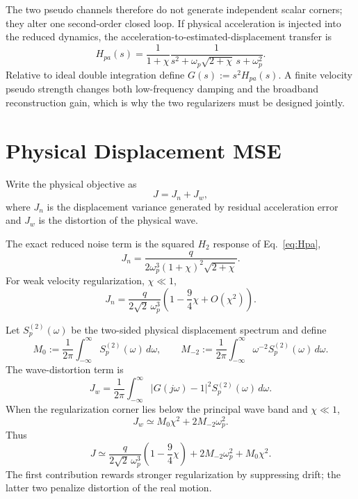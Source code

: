 \documentclass[conference]{IEEEtran}
\begin{document}
The two pseudo channels therefore do not generate independent scalar corners;
they alter one second-order closed loop. If physical acceleration is injected
into the reduced dynamics, the acceleration-to-estimated-displacement transfer
is
\begin{equation}
 \boxed{
 H_{pa}(s)=
 \frac{1}{1+\chi}
 \frac{1}{s^2+\omega_p\sqrt{2+\chi}\,s+\omega_p^2}.}
 \label{eq:Hpa}
\end{equation}
Relative to ideal double integration define $G(s):=s^2H_{pa}(s)$. A finite
velocity pseudo strength changes both low-frequency damping and the broadband
reconstruction gain, which is why the two regularizers must be designed jointly.

\section{Physical Displacement MSE}
\label{sec:mse}

Write the physical objective as
\begin{equation}
 J=J_n+J_w,
\end{equation}
where $J_n$ is the displacement variance generated by residual acceleration
error and $J_w$ is the distortion of the physical wave.

The exact reduced noise term is the squared $H_2$ response of
Eq.~\eqref{eq:Hpa},
\begin{equation}
 \boxed{
 J_n=
 \frac{q}{2\omega_p^3(1+\chi)^2\sqrt{2+\chi}}.}
 \label{eq:Jnoise-exact}
\end{equation}
For weak velocity regularization, $\chi\ll1$,
\begin{equation}
 J_n=
 \frac{q}{2\sqrt{2}\,\omega_p^3}
 \left(1-\frac94\chi+O(\chi^2)\right).
 \label{eq:Jnoise-expansion}
\end{equation}

Let $S_p^{(2)}(\omega)$ be the two-sided physical displacement spectrum and
define
\begin{equation}
 M_0:=\frac{1}{2\pi}\int_{-\infty}^{\infty}
 S_p^{(2)}(\omega)\,d\omega,
 \qquad
 M_{-2}:=\frac{1}{2\pi}\int_{-\infty}^{\infty}
 \omega^{-2}S_p^{(2)}(\omega)\,d\omega.
\end{equation}
The wave-distortion term is
\begin{equation}
 J_w=\frac{1}{2\pi}\int_{-\infty}^{\infty}
 |G(j\omega)-1|^2S_p^{(2)}(\omega)\,d\omega.
 \label{eq:Jwave-exact}
\end{equation}
When the regularization corner lies below the principal wave band and
$\chi\ll1$,
\begin{equation}
 \boxed{J_w\simeq M_0\chi^2+2M_{-2}\omega_p^2.}
 \label{eq:Jwave-asymptotic}
\end{equation}
Thus
\begin{equation}
 \boxed{
 J\simeq
 \frac{q}{2\sqrt{2}\,\omega_p^3}
 \left(1-\frac94\chi\right)
 +2M_{-2}\omega_p^2+M_0\chi^2.}
 \label{eq:J-reduced}
\end{equation}
The first contribution rewards stronger regularization by suppressing drift;
the latter two penalize distortion of the real motion.
\end{document}
